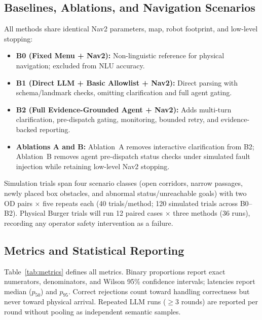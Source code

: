 \documentclass[conference,a4paper]{IEEEtran}
\begin{document}
\subsection{Baselines, Ablations, and Navigation Scenarios}

All methods share identical Nav2 parameters, map, robot footprint, and low-level stopping:
\begin{itemize}
    \item \textbf{B0 (Fixed Menu + Nav2):} Non-linguistic reference for physical navigation; excluded from NLU accuracy.
    \item \textbf{B1 (Direct LLM + Basic Allowlist + Nav2):} Direct parsing with schema/landmark checks, omitting clarification and full agent gating.
    \item \textbf{B2 (Full Evidence-Grounded Agent + Nav2):} Adds multi-turn clarification, pre-dispatch gating, monitoring, bounded retry, and evidence-backed reporting.
    \item \textbf{Ablations A and B:} Ablation~A removes interactive clarification from B2; Ablation~B removes agent pre-dispatch status checks under simulated fault injection while retaining low-level Nav2 stopping.
\end{itemize}
Simulation trials span four scenario classes (open corridors, narrow passages, newly placed box obstacles, and abnormal status/unreachable goals) with two OD pairs $\times$ five repeats each (40 trials/method; 120 simulated trials across B0--B2). Physical Burger trials will run 12 paired cases $\times$ three methods (36 runs), recording any operator safety intervention as a failure.

\subsection{Metrics and Statistical Reporting}

Table~\ref{tab:metrics} defines all metrics. Binary proportions report exact numerators, denominators, and Wilson 95\% confidence intervals; latencies report median ($p_{50}$) and $p_{95}$. Correct rejections count toward handling correctness but never toward physical arrival. Repeated LLM runs ($\ge 3$ rounds) are reported per round without pooling as independent semantic samples.
\end{document}

